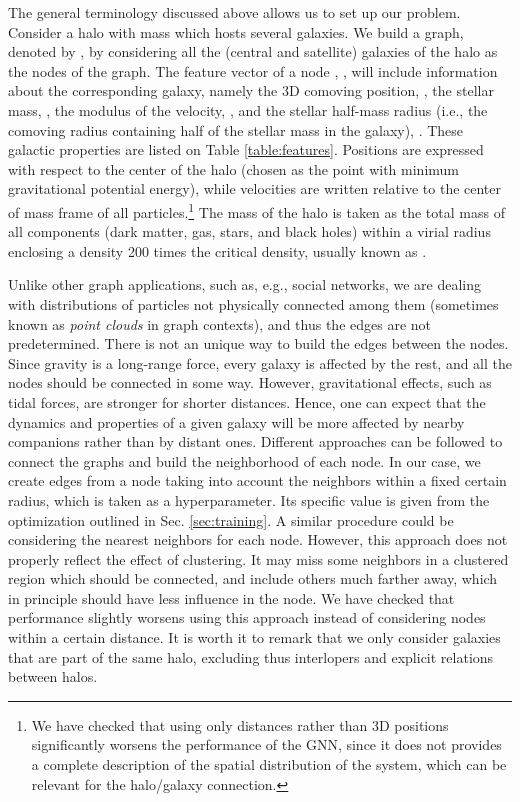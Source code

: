\documentclass[twocolumn]{aastex631}
\begin{document}
The general terminology discussed above allows us to set up our problem. Consider a halo  with mass  which hosts several  galaxies. We build a graph, denoted by , by considering all the (central and satellite) galaxies of the halo as the nodes of the graph. The feature vector of a node , , will include information about the corresponding galaxy, namely the 3D comoving position, , the stellar mass, , the modulus of the velocity, , and the stellar half-mass radius (i.e., the comoving radius containing half of the stellar mass in the galaxy), . These galactic properties are listed on Table \ref{table:features}. Positions are expressed with respect to the center of the halo (chosen as the point with minimum gravitational potential energy), while velocities are written relative to the center of mass frame of all particles.\footnote{We have checked that using only distances rather than 3D positions significantly worsens the performance of the GNN, since it does not provides a complete description of the spatial distribution of the system, which can be relevant for the halo/galaxy connection.} The mass of the halo is taken as the total mass of all components (dark matter, gas, stars, and black holes) within a virial radius enclosing a density 200 times the critical density, usually known as .

Unlike other graph applications, such as, e.g., social networks, we are dealing with distributions of particles not physically connected among them (sometimes known as \textit{point clouds} in graph contexts), and thus the edges are not predetermined. There is not an unique way to build the edges between the nodes. Since gravity is a long-range force, every galaxy is affected by the rest, and all the nodes should be connected in some way. However, gravitational effects, such as tidal forces, are stronger for shorter distances. Hence, one can expect that the dynamics and properties of a given galaxy will be more affected by nearby companions rather than by distant ones. Different approaches can be followed to connect the graphs and build the neighborhood of each node. In our case, we create edges from a node taking into account the neighbors within a fixed certain radius, which is taken as a hyperparameter. Its specific value is given from the optimization outlined in Sec. \ref{sec:training}. A similar procedure could be considering the  nearest neighbors for each node. However, this approach does not properly reflect the effect of clustering. It may miss some neighbors in a clustered region which should be connected, and include others much farther away, which in principle should have less influence in the node. We have checked that performance slightly worsens using this approach instead of considering nodes within a certain distance. It is worth it to remark that we only consider galaxies that are part of the same halo, excluding thus interlopers and explicit relations between halos.
\end{document}
